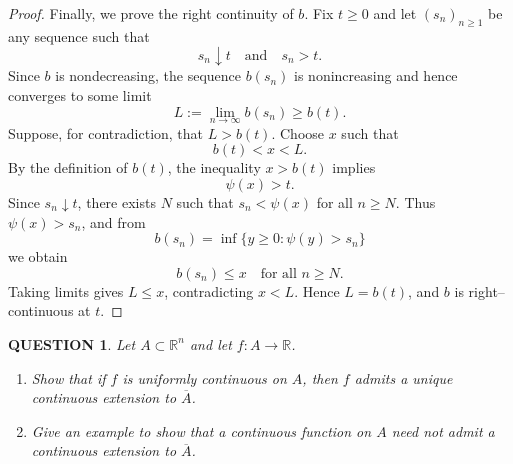 \documentclass[12pt]{article}
\renewcommand{\(}{\left(}%
\renewcommand{\)}{\right)}%
\renewcommand{\[}{\left[}%
\renewcommand{\]}{\right]}%
\newtheorem{question}{QUESTION}[section]}
\newtheorem{proof}{Proof.}}
\begin{document}
\begin{proof}
Finally, we prove the right continuity of $b$.
Fix $t\ge 0$ and let $(s_n)_{n\ge1}$ be any sequence such that
\begin{equation*}
s_n\downarrow t \quad\text{and}\quad s_n>t.
\end{equation*}
Since $b$ is nondecreasing, the sequence $b(s_n)$ is nonincreasing and hence
converges to some limit
\begin{equation*}
L:=\lim_{n\to\infty} b(s_n)\ge b(t).
\end{equation*}
Suppose, for contradiction, that $L>b(t)$.
Choose $x$ such that
\begin{equation*}
b(t)<x<L.
\end{equation*}
By the definition of $b(t)$, the inequality $x>b(t)$ implies
\begin{equation*}
\psi(x)>t.
\end{equation*}
Since $s_n\downarrow t$, there exists $N$ such that $s_n<\psi(x)$ for all $n\ge N$.
Thus $\psi(x)>s_n$, and from
\begin{equation*}
b(s_n)=\inf\{y\ge 0:\psi(y)>s_n\}
\end{equation*}
we obtain
\begin{equation*}
b(s_n)\le x \quad\text{for all } n\ge N.
\end{equation*}
Taking limits gives $L\le x$, contradicting $x<L$.
Hence $L=b(t)$, and $b$ is right--continuous at $t$.
\end{proof}

\begin{question}
Let $A \subset \mathbb{R}^n$ and let $f: A \to \mathbb{R}$.
\begin{enumerate}
    \item Show that if $f$ is uniformly continuous on $A$, then $f$ admits a unique continuous extension to $\overline{A}$.
    \item Give an example to show that a continuous function on $A$ need not admit a continuous extension to $\overline{A}$.
\end{enumerate}
\end{question}
\end{document}
